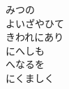 \documentclass[10pt,b5j]{tarticle} %
\begin{document}
\begin{enumerate}
\begin{minipage}[c]{\blocksize}
        
        \vspace{\linespace}
        \item
        みつの\\
        よいざやひて\\
        きわれにあり\\
        にへしも\\
        へなるを\\
        にくましく
    
    \end{minipage}
\end{enumerate} %
\end{document}

